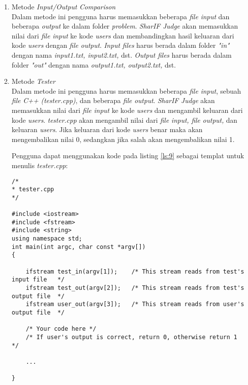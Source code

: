 \begin{enumerate}
	\item Metode \textit{Input/Output Comparison} \\
	Dalam metode ini pengguna harus memasukkan beberapa \textit{file input} dan beberapa \textit{output} ke dalam folder \textit{problem}. \textit{SharIF Judge} akan memasukkan nilai dari \textit{file input} ke kode \textit{users} dan membandingkan hasil keluaran dari kode \textit{users} dengan \textit{file output}. \textit{Input files} harus berada dalam folder \textit{"in"} dengan nama \textit{input1.txt, input2.txt,} dst. \textit{Output files} harus berada dalam folder \textit{"out"} dengan nama \textit{output1.txt, output2.txt,} dst.
	
	\item Metode \textit{Tester} \\
	Dalam metode ini pengguna harus memasukkan beberapa \textit{file input}, sebuah \textit{file C++ (tester.cpp)}, dan beberapa \textit{file output}. \textit{SharIF Judge} akan memasukkan nilai dari \textit{file input} ke kode \textit{users} dan mengambil keluaran dari kode \textit{users}. \textit{tester.cpp} akan mengambil nilai dari \textit{file input, file output,} dan keluaran \textit{users}. Jika keluaran dari kode \textit{users} benar maka akan mengembalikan nilai 0, sedangkan jika salah akan mengembalikan nilai 1.
	
	Pengguna dapat menggunakan kode pada listing \ref{ls:9} sebagai templat untuk menulis \textit{tester.cpp}:
	\begin{lstlisting}[basicstyle=\ttfamily, frame=single,
	columns=fullflexible, keepspaces=true, breaklines=true, label=ls:9, caption=Contoh kode \textit{tester.cpp}]
/*
* tester.cpp
*/

#include <iostream>
#include <fstream>
#include <string>
using namespace std;
int main(int argc, char const *argv[])
{

	ifstream test_in(argv[1]);    /* This stream reads from test's input file   */
	ifstream test_out(argv[2]);   /* This stream reads from test's output file  */
	ifstream user_out(argv[3]);   /* This stream reads from user's output file  */
	
	/* Your code here */
	/* If user's output is correct, return 0, otherwise return 1       */
	
	...

}
	\end{lstlisting}
\end{enumerate}

